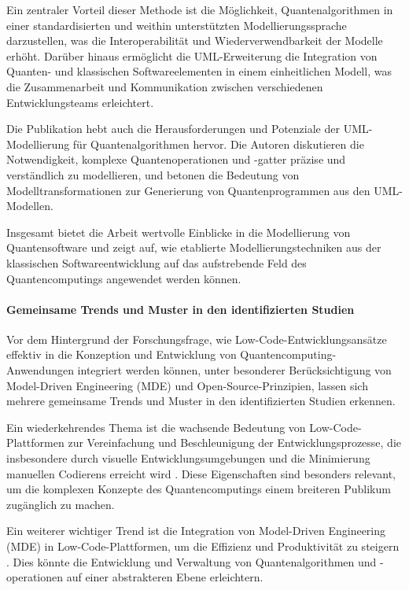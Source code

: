 Ein zentraler Vorteil dieser Methode ist die Möglichkeit, Quantenalgorithmen in einer standardisierten und 
weithin unterstützten Modellierungssprache darzustellen, was die Interoperabilität und Wiederverwendbarkeit 
der Modelle erhöht. Darüber hinaus ermöglicht die UML-Erweiterung die Integration von Quanten- und klassischen 
Softwareelementen in einem einheitlichen Modell, was die Zusammenarbeit und Kommunikation zwischen verschiedenen 
Entwicklungsteams erleichtert.

Die Publikation hebt auch die Herausforderungen und Potenziale der UML-Modellierung für Quantenalgorithmen hervor. 
Die Autoren diskutieren die Notwendigkeit, komplexe Quantenoperationen und -gatter präzise und verständlich zu 
modellieren, und betonen die Bedeutung von Modelltransformationen zur Generierung von Quantenprogrammen aus den UML-Modellen.

Insgesamt bietet die Arbeit wertvolle Einblicke in die Modellierung von Quantensoftware und zeigt auf, wie 
etablierte Modellierungstechniken aus der klassischen Softwareentwicklung auf das aufstrebende Feld des 
Quantencomputings angewendet werden können.

\paragraph{Gemeinsame Trends und Muster in den identifizierten Studien}

Vor dem Hintergrund der Forschungsfrage, wie Low-Code-Entwicklungsansätze effektiv in die Konzeption 
und Entwicklung von Quantencomputing-Anwendungen integriert werden können, unter besonderer Berücksichtigung 
von Model-Driven Engineering (MDE) und Open-Source-Prinzipien, lassen sich mehrere gemeinsame Trends und 
Muster in den identifizierten Studien erkennen.

Ein wiederkehrendes Thema ist die wachsende Bedeutung von Low-Code-Plattformen zur Vereinfachung und 
Beschleunigung der Entwicklungsprozesse, die insbesondere durch visuelle Entwicklungsumgebungen und 
die Minimierung manuellen Codierens erreicht wird \cite{Khorram_2020, Sahay_2020, Bock_2021}. Diese 
Eigenschaften sind besonders relevant, um die komplexen Konzepte des Quantencomputings einem breiteren Publikum zugänglich zu machen.

Ein weiterer wichtiger Trend ist die Integration von Model-Driven Engineering (MDE) in Low-Code-Plattformen, 
um die Effizienz und Produktivität zu steigern \cite{Gemeinhardt_2021, Moin_2021, Perez-Castillo_2022}. 
Dies könnte die Entwicklung und Verwaltung von Quantenalgorithmen und -operationen auf einer abstrakteren Ebene erleichtern.

